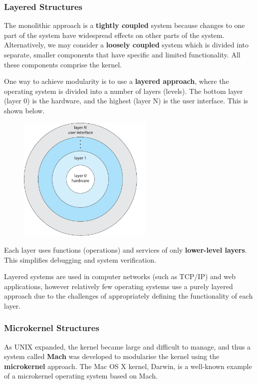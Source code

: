 \documentclass{article}
\begin{document}
\subsubsection{Layered Structures}
The monolithic approach is a \textbf{tightly coupled} system because
changes to one part of the system have widespread effects on other
parts of the system. Alternatively, we may consider a \textbf{loosely
coupled} system which is divided into separate, smaller components that
have specific and limited functionality. All these components comprise
the kernel.

One way to achieve modularity is to use a \textbf{layered approach},
where the operating system is divided into a number of layers (levels).
The bottom layer (layer 0) is the hardware, and the highest (layer N)
is the user interface. This is shown below.
\begin{figure}[H]
    \centering
    \includegraphics[height = 6cm]{figures/layered_structure.pdf}
\end{figure}
Each layer uses functions (operations) and services of only
\textbf{lower-level layers}.
This simplifies debugging and system verification.

Layered systems are used in computer networks (such as TCP/IP) and web
applications, however relatively few operating systems use a purely
layered approach due to the challenges of appropriately defining the
functionality of each layer.
\subsubsection{Microkernel Structures}
As UNIX expanded, the kernel became large and difficult to manage, and
thus a system called \textbf{Mach} was developed to modularise the
kernel using the \textbf{microkernel} approach. The Mac OS X kernel,
Darwin, is a well-known example of a microkernel operating system based
on Mach.
\end{document}
